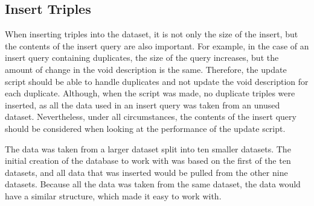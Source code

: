 

\subsection{Insert Triples}\label{sec:insert-triples}
When inserting triples into the dataset, it is not only the size of the insert, but the contents of the insert query are also important. For example, in the case of an insert query containing duplicates, the size of the query increases, but the amount of change in the \gls{void} description is the same. Therefore, the update script should be able to handle duplicates and not update the \gls{void} description for each duplicate. Although, when the script was made, no duplicate triples were inserted, as all the data used in an insert query was taken from an unused dataset. Nevertheless, under all circumstances, the contents of the insert query should be considered when looking at the performance of the update script.


The data was taken from a larger dataset split into ten smaller datasets. The initial creation of the database to work with was based on the first of the ten datasets, and all data that was inserted would be pulled from the other nine datasets. Because all the data was taken from the same dataset, the data would have a similar structure, which made it easy to work with.



